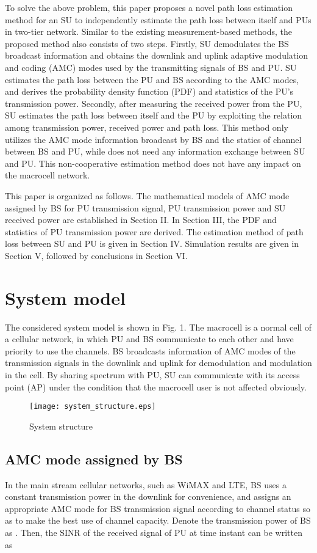 \documentclass[conference]{IEEEtran}
\begin{document}
To solve the above problem, this paper proposes a novel path loss
estimation method for an SU to independently estimate the path loss
between itself and PUs in two-tier network. Similar to the existing
measurement-based methods, the proposed method also consists of two
steps. Firstly, SU demodulates the BS broadcast information and
obtains the downlink and uplink adaptive modulation and coding (AMC)
modes used by the transmitting signals of BS and PU. SU estimates
the path loss between the PU and BS according to the AMC modes, and
derives the probability density function (PDF) and statistics of the
PU's transmission power. Secondly, after measuring the received
power from the PU, SU estimates the path loss between itself and the
PU by exploiting the relation among transmission power, received
power and path loss. This method only utilizes the AMC mode
information broadcast by BS and the statics of channel between BS
and PU, while does not need any information exchange between SU and
PU. This non-cooperative estimation method does not have any impact
on the macrocell network.

This paper is organized as follows. The mathematical models of AMC
mode assigned by BS for PU transmission signal, PU transmission
power and SU received power are established in Section II. In
Section III, the PDF and statistics of PU transmission power are
derived. The estimation method of path loss between SU and PU is
given in Section IV. Simulation results are given in Section V,
followed by conclusions in Section VI.


\section{System model}
The considered system model is shown in Fig. 1. The macrocell is a
normal cell of a cellular network, in which PU and BS communicate to
each other and have priority to use the channels. BS broadcasts
information of AMC modes of the transmission signals in the downlink
and uplink for demodulation and modulation in the cell. By sharing
spectrum with PU, SU can communicate with its access point (AP)
under the condition that the macrocell user is not affected
obviously.
\begin{figure}[!t]
\centering
\texttt{[image: system\_structure.eps]}
\caption{System structure} \label{system_structure}
\end{figure}
\subsection{AMC mode assigned by BS}
In the main stream cellular networks, such as WiMAX and LTE, BS uses
a constant transmission power in the downlink for convenience, and
assigns an appropriate AMC mode for BS transmission signal according
to channel status so as to make the best use of channel capacity.
Denote the transmission power of BS as . Then, the SINR of the
received signal of PU at time instant  can be written as
\end{document}
